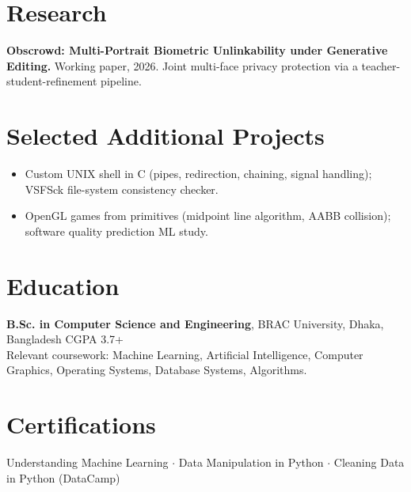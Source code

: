 \documentclass[11pt,a4paper]{article}
\begin{document}
\section{Research}
\textbf{Obscrowd: Multi-Portrait Biometric Unlinkability under Generative Editing.} Working paper, 2026. Joint multi-face privacy protection via a teacher-student-refinement pipeline.

\section{Selected Additional Projects}
\begin{itemize}
  \item Custom UNIX shell in C (pipes, redirection, chaining, signal handling); VSFSck file-system consistency checker.
  \item OpenGL games from primitives (midpoint line algorithm, AABB collision); software quality prediction ML study.
\end{itemize}

\section{Education}
\textbf{B.Sc. in Computer Science and Engineering}, BRAC University, Dhaka, Bangladesh \hfill CGPA 3.7+\\
Relevant coursework: Machine Learning, Artificial Intelligence, Computer Graphics, Operating Systems, Database Systems, Algorithms.

\section{Certifications}
Understanding Machine Learning $\cdot$ Data Manipulation in Python $\cdot$ Cleaning Data in Python (DataCamp)
\end{document}
